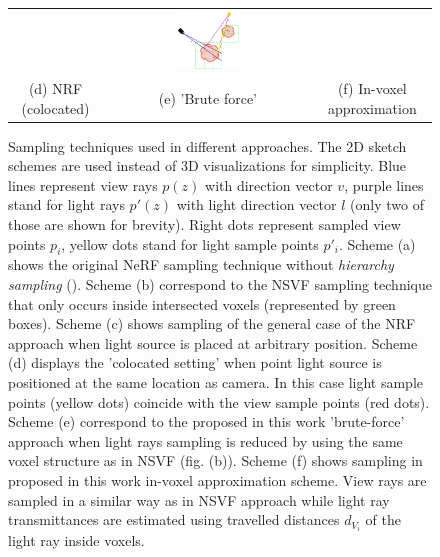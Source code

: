 \begin{figure}
\begin{tabular}{ccc}
          & \includegraphics[width=0.32\textwidth]{figures/sampling_iva.png}
          \\(d) NRF (colocated) & (e) 'Brute force'& (f) In-voxel approximation
    \end{tabular}
    \caption{
Sampling techniques used in different approaches.
The 2D sketch schemes are used instead of 3D visualizations for simplicity.
Blue lines represent view rays $p(z)$ with direction vector $v$,
purple lines stand for light rays $p'(z)$ with light direction vector $l$
(only two of those are shown for brevity).
Right dots represent sampled view points $p_i$, yellow dots stand for light sample points $p'_i$.
Scheme (a) shows the original NeRF sampling technique without \textit{hierarchy sampling} ().
Scheme (b) correspond to the NSVF sampling technique
that only occurs inside intersected voxels (represented by green boxes).
Scheme (c) shows sampling of the general case of the NRF approach
when light source is placed at arbitrary position.
Scheme (d) displays the 'colocated setting'
when point light source is positioned at the same location as camera.
In this case light sample points (yellow dots) coincide with the view sample points (red dots).
Scheme (e) correspond to the proposed in this work 'brute-force' approach
when light rays sampling is reduced by using the same voxel structure as in NSVF (fig. (b)).
Scheme (f) shows sampling in proposed in this work in-voxel approximation scheme.
View rays are sampled in a similar way as in NSVF approach
while light ray transmittances are estimated using travelled distances $d_{V_i}$
of the light ray inside voxels.
}
\end{figure}

